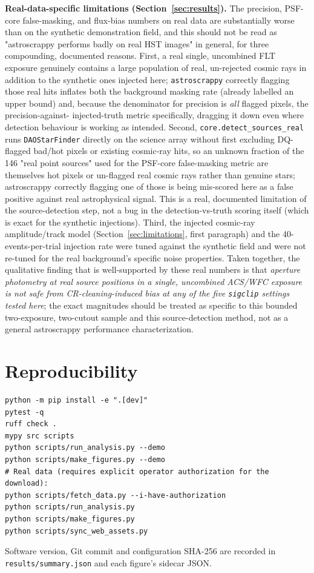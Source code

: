 \documentclass[11pt]{article}
\begin{document}
\textbf{Real-data-specific limitations (Section~\ref{sec:results}).} The
precision, PSF-core false-masking, and flux-bias numbers on real data are
substantially worse than on the synthetic demonstration field, and this
should not be read as "astroscrappy performs badly on real HST images" in
general, for three compounding, documented reasons. First, a real single,
uncombined FLT exposure genuinely contains a large population of real,
un-rejected cosmic rays in addition to the synthetic ones injected here;
\texttt{astroscrappy} correctly flagging those real hits inflates both the
background masking rate (already labelled an upper bound) and, because the
denominator for precision is \emph{all} flagged pixels, the precision-against-
injected-truth metric specifically, dragging it down even where detection
behaviour is working as intended. Second,
\texttt{core.detect\_sources\_real} runs \texttt{DAOStarFinder} directly on
the science array without first excluding DQ-flagged bad/hot pixels or
existing cosmic-ray hits, so an unknown fraction of the 146
"real point sources" used for the PSF-core false-masking metric are
themselves hot pixels or un-flagged real cosmic rays rather than genuine
stars; astroscrappy correctly flagging one of those is being mis-scored here
as a false positive against real astrophysical signal. This is a real,
documented limitation of the source-detection step, not a bug in the
detection-vs-truth scoring itself (which is exact for the synthetic
injections). Third, the injected cosmic-ray amplitude/track model
(Section~\ref{sec:limitations}, first paragraph) and the 40-events-per-trial
injection rate were tuned against the synthetic field and were not
re-tuned for the real background's specific noise properties. Taken
together, the qualitative finding that is well-supported by these real
numbers is that \emph{aperture photometry at real source positions in a
single, uncombined ACS/WFC exposure is not safe from CR-cleaning-induced
bias at any of the five \texttt{sigclip} settings tested here}; the exact
magnitudes should be treated as specific to this bounded two-exposure,
two-cutout sample and this source-detection method, not as a general
astroscrappy performance characterization.

\section{Reproducibility}
\label{sec:reproducibility}
\begin{verbatim}
python -m pip install -e ".[dev]"
pytest -q
ruff check .
mypy src scripts
python scripts/run_analysis.py --demo
python scripts/make_figures.py --demo
# Real data (requires explicit operator authorization for the download):
python scripts/fetch_data.py --i-have-authorization
python scripts/run_analysis.py
python scripts/make_figures.py
python scripts/sync_web_assets.py
\end{verbatim}
Software version, Git commit and configuration SHA-256 are recorded in
\texttt{results/summary.json} and each figure's sidecar JSON.
\end{document}
